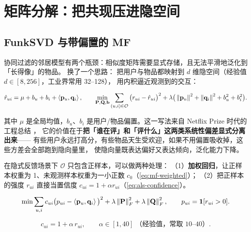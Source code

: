 \section{矩阵分解：把共现压进隐空间}

\subsection{FunkSVD 与带偏置的 MF}

协同过滤的邻居模型有两个瓶颈：相似度矩阵需要显式存储，且无法平滑地泛化到「长得像」的物品。
换了一个思路：
把用户与物品都映射到 $d$ 维隐空间（经验值 $d \in [8, 256]$，工业界常用 32--128），
用内积逼近观测到的交互：

\begin{equation}
\hat r_{ui} = \mu + b_u + b_i + \left\langle \mathbf{p}_u, \mathbf{q}_i \right\rangle ,
\qquad
\min_{\mathbf{P}, \mathbf{Q}, \mathbf{b}} \sum_{(u,i) \in \mathcal{O}}
\big( r_{ui} - \hat r_{ui} \big)^2 + \lambda \big( \left\lVert \mathbf{p}_u \right\rVert^2 + \left\lVert \mathbf{q}_i \right\rVert^2 + b_u^2 + b_i^2 \big) .
\label{eq:mf-bias}
\end{equation}

其中 $\mu$ 是全局均值，$b_u$、$b_i$ 是用户/物品偏置。这一写法来自 Netflix Prize 时代的工程总结 \cite{koren2009mf}，
它的价值在于\textbf{把「谁在评」和「评什么」这两类系统性偏差显式分离出来}——
有些用户永远打高分，有些物品天生受欢迎，如果不用偏置吸收掉，这些方差会全部跑到隐向量里，
使隐向量既表达偏好又表达倾向，泛化能力下降。

在隐式反馈场景下 $\mathcal{O}$ 只包含正样本，可以做两种处理：
（1）\textbf{加权回归}，让正样本权重为 1、未观测样本权重为一小正数 $c_0$（\cref{eq:mf-weighted}）；
（2）把正样本的强度 $r_{ui}$ 直接当置信度 $c_{ui} = 1 + \alpha r_{ui}$（\cref{eq:als-confidence}）。

\begin{equation}
\min \sum_{u,i} c_{ui} \big( p_{ui} - \left\langle \mathbf{p}_u, \mathbf{q}_i \right\rangle \big)^2 + \lambda \left\lVert \mathbf{P} \right\rVert_F^2 + \lambda \left\lVert \mathbf{Q} \right\rVert_F^2 ,
\qquad p_{ui} = \mathbf{1}[r_{ui} > 0] .
\label{eq:mf-weighted}
\end{equation}

\begin{equation}
c_{ui} = 1 + \alpha \, r_{ui}, \qquad \alpha \in [1, 40] \; \text{（经验值，常取 10--40）}.
\label{eq:als-confidence}
\end{equation}

